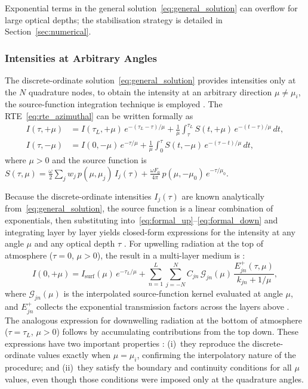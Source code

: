 \documentclass[a4paper, 11pt]{article}
\begin{document}
Exponential terms in the general solution~\eqref{eq:general_solution}
can overflow for large optical depths; the stabilisation strategy is
detailed in Section~\ref{sec:numerical}.

\subsubsection{Intensities at Arbitrary Angles}

The discrete-ordinate solution~\eqref{eq:general_solution} provides
intensities only at the $N$ quadrature nodes, to obtain the intensity
at an arbitrary direction $\mu \neq \mu_i$, the source-function
integration technique is employed \cite{stamnes1982,disortreport}.  The
RTE~\eqref{eq:rte_azimuthal} can be written formally as
%
\begin{align}
  I(\tau,+\mu) &= I(\tau_L,+\mu)\,e^{-(\tau_L-\tau)/\mu}
  + \frac{1}{\mu}\int_{\tau}^{\tau_L}
    S(t,+\mu)\,e^{-(t-\tau)/\mu}\,dt,
  \label{eq:formal_up}\\[4pt]
  I(\tau,-\mu) &= I(0,-\mu)\,e^{-\tau/\mu}
  + \frac{1}{\mu}\int_{0}^{\tau}
    S(t,-\mu)\,e^{-(\tau-t)/\mu}\,dt,
  \label{eq:formal_down}
\end{align}
%
where $\mu > 0$ and the source function is
$S(\tau,\mu) = \frac{\omega}{2}\sum_j w_j\,p(\mu,\mu_j)\,I_j(\tau)
+ \frac{\omega F_0}{4\pi}\,p(\mu,-\mu_0)\,e^{-\tau/\mu_0}$.

Because the discrete-ordinate intensities $I_j(\tau)$ are known
analytically from~\eqref{eq:general_solution}, the source function is
a linear combination of exponentials, then substituting into~\eqref{eq:formal_up}--\eqref{eq:formal_down} and integrating layer by
layer yields closed-form expressions for the intensity at any angle
$\mu$ and any optical depth $\tau$ \cite{disortreport}.  For
upwelling radiation at the top of atmosphere ($\tau = 0$, $\mu > 0$),
the result in a multi-layer medium is \cite{disortreport}:
%
\begin{equation}
  I(0,+\mu) = I_{\text{surf}}(\mu)\,e^{-\tau_L/\mu}
  + \sum_{n=1}^{L}\sum_{j=-N}^{N}
    C_{jn}\,\mathcal{G}_{jn}(\mu)\,
    \frac{E_{jn}^{+}(\tau,\mu)}{k_{jn} + 1/\mu},
  \label{eq:intensity_toa}
\end{equation}
%
where $\mathcal{G}_{jn}(\mu)$ is the interpolated source-function
kernel evaluated at angle $\mu$, and $E_{jn}^{+}$ collects the
exponential transmission factors across the layers above \cite{disortreport}.  The analogous
expression for downwelling radiation at the bottom of atmosphere
($\tau = \tau_L$, $\mu > 0$) follows by accumulating contributions from
the top down.  These expressions have two important properties
\cite{stamnes1982,disortreport}: (i)~they reproduce the
discrete-ordinate values exactly when $\mu = \mu_i$, confirming the
interpolatory nature of the procedure; and (ii)~they satisfy the
boundary and continuity conditions for all $\mu$ values, even though
those conditions were imposed only at the quadrature angles.
\end{document}
